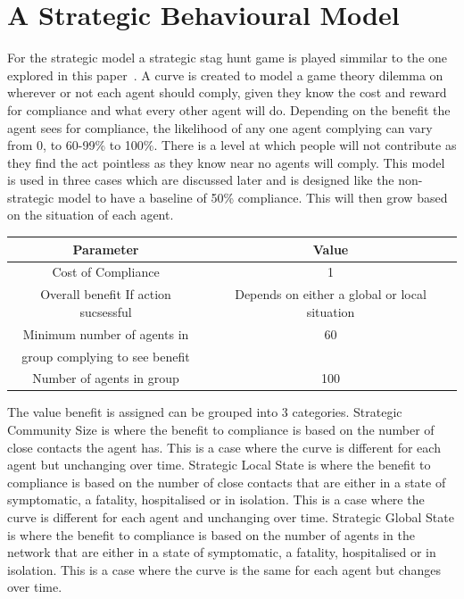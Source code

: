 \documentclass{article}
\begin{document}
\section{A Strategic Behavioural Model}
For the strategic model a strategic stag hunt game is played simmilar to the one explored in this paper~\cite{pacheco_santos_souza_2014}.  A curve is created to model a game theory dilemma on wherever or not each agent should comply, given they know the cost and reward for compliance and what every other agent will do. Depending on the benefit the agent sees for compliance, the likelihood of any one agent complying can vary from 0, to 60-99\% to 100\%. There is a level at which people will not contribute as they find the act pointless as they know near no agents will comply. This model is used in three cases which are discussed later and is designed like the non-strategic model to have a baseline of 50\% compliance. This will then grow based on the situation of each agent.\newline

\begin{tabular}{|c|c|}
\hline
Parameter & Value \\ \hline
Cost of Compliance & 1 \\ \hline
Overall benefit If action sucsessful & Depends on either a global or local situation\\ \hline
Minimum number of agents in  & 60\\ 
group complying to see benefit & \\\hline
Number of agents in group & 100\\ \hline
\end{tabular}
\newline

The value benefit  is assigned can be grouped into 3 categories. Strategic Community Size is where the benefit to compliance is based on the number of close contacts the agent has. This is a case where the curve is different for each agent but unchanging over time. Strategic Local State is where the benefit to compliance is based on the number of close contacts that are either in a state of symptomatic, a fatality, hospitalised or in isolation. This is a case where the curve is different for each agent and unchanging over time. Strategic Global State is where the benefit to compliance is based on the number of agents in the network that are either in a state of symptomatic, a fatality, hospitalised or in isolation. This is a case where the curve is the same for each agent but changes over time. \newline
\end{document}
